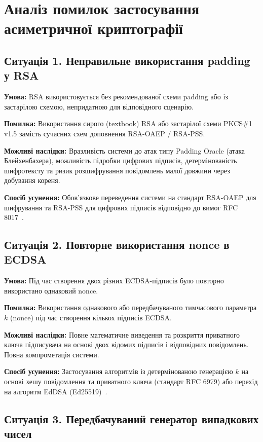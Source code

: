 \section{Аналіз помилок застосування асиметричної криптографії}

\subsection{Ситуація 1. Неправильне використання padding у RSA}

\textbf{Умова:} RSA використовується без рекомендованої схеми padding або із застарілою схемою,
непридатною для відповідного сценарію.

\textbf{Помилка:} Використання сирого (textbook) RSA або застарілої схеми PKCS\#1 v1.5 замість сучасних схем
доповнення RSA-OAEP / RSA-PSS.

\textbf{Можливі наслідки:} Вразливість системи до атак типу Padding Oracle (атака Блейхенбахера), можливість
підробки цифрових підписів, детермінованість шифротексту та ризик розшифрування повідомлень малої
довжини через добування кореня.

\textbf{Спосіб усунення:} Обов'язкове переведення системи на стандарт RSA-OAEP для шифрування та
RSA-PSS для цифрових підписів відповідно до вимог RFC 8017~\cite{RFC8017}.

\subsection{Ситуація 2. Повторне використання nonce в ECDSA}

\textbf{Умова:} Під час створення двох різних ECDSA-підписів було повторно використано однаковий nonce.

\textbf{Помилка:} Використання однакового або передбачуваного тимчасового параметра $k$ (nonce) під час
створення кількох підписів ECDSA.

\textbf{Можливі наслідки:} Повне математичне виведення та розкриття приватного ключа підписувача на
основі двох відомих підписів і відповідних повідомлень. Повна компрометація системи.

\textbf{Спосіб усунення:} Застосування алгоритмів із детермінованою генерацією $k$ на основі хешу
повідомлення та приватного ключа (стандарт RFC 6979) або перехід на алгоритм EdDSA
(Ed25519)~\cite{RFC6979,RFC8032}.

\subsection{Ситуація 3. Передбачуваний генератор випадкових чисел}


